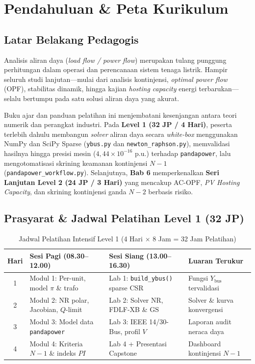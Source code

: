 \documentclass[11pt,a4paper]{report}
\begin{document}
\tableofcontents
\newpage

\chapter{Pendahuluan \& Peta Kurikulum}

\section{Latar Belakang Pedagogis}
Analisis aliran daya (\textit{load flow / power flow}) merupakan tulang punggung perhitungan dalam operasi dan perencanaan sistem tenaga listrik. Hampir seluruh studi lanjutan---mulai dari analisis kontinjensi, \textit{optimal power flow} (OPF), stabilitas dinamik, hingga kajian \textit{hosting capacity} energi terbarukan---selalu bertumpu pada satu solusi aliran daya yang akurat.

Buku ajar dan panduan pelatihan ini menjembatani kesenjangan antara teori numerik dan perangkat industri. Pada \textbf{Level 1 (32 JP / 4 Hari)}, peserta terlebih dahulu membangun \textit{solver} aliran daya secara \textit{white-box} menggunakan NumPy dan SciPy Sparse (\texttt{ybus.py} dan \texttt{newton\_raphson.py}), memvalidasi hasilnya hingga presisi mesin ($4{,}44\times 10^{-16}\text{ p.u.}$) terhadap \texttt{pandapower}, lalu mengotomatisasi skrining keamanan kontinjensi $N-1$ (\texttt{pandapower\_workflow.py}). Selanjutnya, \textbf{Bab 6} memperkenalkan \textbf{Seri Lanjutan Level 2 (24 JP / 3 Hari)} yang mencakup AC-OPF, \textit{PV Hosting Capacity}, dan skrining kontinjensi ganda $N-2$ berbasis risiko.

\section{Prasyarat \& Jadwal Pelatihan Level 1 (32 JP)}

\begin{table}[H]
\centering
\caption{Jadwal Pelatihan Intensif Level 1 (4 Hari $\times$ 8 Jam = 32 Jam Pelatihan)}
\small
\begin{tabular}{@{}clll@{}}
\toprule
\textbf{Hari} & \textbf{Sesi Pagi (08.30--12.00)} & \textbf{Sesi Siang (13.00--16.30)} & \textbf{Luaran Terukur} \\
\midrule
1 & Modul 1: Per-unit, model $\pi$ \& trafo & Lab 1: \texttt{build\_ybus()} sparse CSR & Fungsi $Y_{\text{bus}}$ tervalidasi \\
2 & Modul 2: NR polar, Jacobian, $Q$-limit & Lab 2: Solver NR, FDLF-XB \& GS & Solver \& kurva konvergensi \\
3 & Modul 3: Model data \texttt{pandapower} & Lab 3: IEEE 14/30-Bus, profil $V$ & Laporan audit neraca daya \\
4 & Modul 4: Kriteria $N-1$ \& indeks $PI$ & Lab 4 + Presentasi Capstone & Dashboard kontinjensi $N-1$ \\
\bottomrule
\end{tabular}
\end{table}
\end{document}
